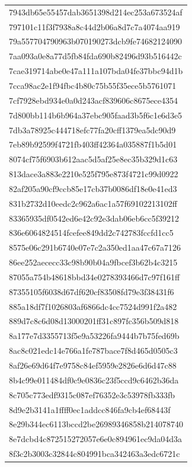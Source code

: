 \begin{tabular}{l}
7943db65e55457dab3651398d214ec253a673524af \\
797101c11f3f7938a8c44d2b06a8d7c7a4074aa919 \\
79a557704790963b070190273dcb9fe74682124090 \\
7aa093a0e8a77d5fb84fda690b82496d93b516442c \\
7cae319714abe0e47a111a107bda04fe37bbc94d1b \\
7cca98ac2e1f94fbc4b80c75b55f35ece5b5761071 \\
7cf7928ebd934e0a0d243acf839606c8675ece4354 \\
7d800bb114b6b964a37ebc905faad3b5f6c1e6d3e5 \\
7db3a78925c444718efc77fa20cff1379ea5dc90d9 \\
7eb89b92599f4721fb403ff42364a035887f1b5d01 \\
8074cf75f6903b612aac5d5af25e8ec35b329d1c63 \\
813dace3a883e2210e525f795e873f4721c99d0922 \\
82af205a90cf9ccb85e17cb37b0086df18e0e41ed3 \\
831b2732d10eedc2c962a6ac1a57f69102213102ff \\
83365935df0542ed6e42c92e3dab06eb6cc5f39212 \\
836e6064824514fcefee849dd2c742783fccfd1cc5 \\
8575e06c291b6740e07e7c2a350ed1aa47c67a7126 \\
86ee252aececc33c98b90b04a9fbcef3b62b4c3215 \\
87055a754b48618bbd34e0278393466d7c97f161ff \\
87355105f6038d67df620cf83508fd79e3f38431f6 \\
885a18df7f1026803af6866dc4cc7524d991f2a482 \\
889d7c8c6d08d13000201ff31c897fc356b509d818 \\
8a177e7d3355713f5e9a53226fa9444b7b75fed69b \\
8ac8c021edc14e766a1fe787bace7f8d465d0505c3 \\
8af26e69d64f7e9758c84ef5959e2826e6d6d47c88 \\
8b4c99e011484df0c9e0836c23f5ccd9c6462b36da \\
8c705c773edf9315c087ef76352e3c53978fb333fb \\
8d9e2b3141a1ffff0ec1addcc846fa9cb4ef68443f \\
8e29b344ec6113bccd2be26989346858b214078740 \\
8e7dcbd4c872515272057e6e0c894961ec9da04d3a \\
8f3c2b3003c32844c804991bca342463a3edc6721c \\

\end{tabular}
